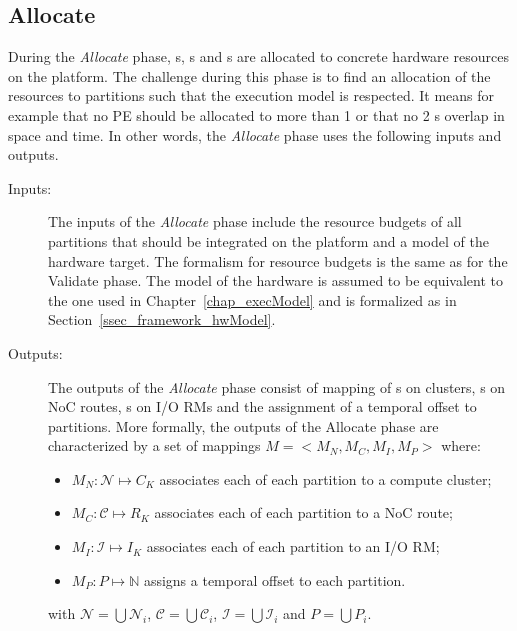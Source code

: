 \documentclass[main.tex]{subfiles}
\begin{document}
\subsection{Allocate} During the \emph{Allocate} phase, \PN{}s, \PC{}s and
\ION{}s are allocated to concrete hardware resources on the platform. The
challenge during this phase is to find an allocation of the resources to
partitions such that the execution model is respected. It means for example
that no PE should be allocated to more than 1 \PN{} or that no 2 \PC{}s overlap
in space and time. In other words, the \emph{Allocate} phase uses the following
inputs and outputs.
\begin{description}
    \item[Inputs: ]
        The inputs of the \emph{Allocate} phase include the resource budgets of
        all partitions that should be integrated on the platform and a model of
        the hardware target. The formalism for resource budgets is the same as
        for the Validate phase. The model of the hardware is assumed to be
        equivalent to the one used in Chapter~\ref{chap_execModel} and is
        formalized as in Section~\ref{ssec_framework_hwModel}. 
    \item[Outputs: ]
        The outputs of the \emph{Allocate} phase consist of mapping of \PN{}s
        on clusters, \PC{}s on NoC routes, \ION{}s on I/O RMs and the
        assignment of a temporal offset to partitions. More formally, the
        outputs of the Allocate phase are characterized by a set of mappings $M
        = < M_N , M_C , M_I , M_P >$ where:  
        \begin{itemize}
            \item $M_N : \mathcal{N} \mapsto C_K$ associates each \PN{} of each
                partition to a compute cluster;
            \item $M_C : \mathcal{C} \mapsto R_K$ associates each \PC{} of each
                partition to a NoC route;
            \item $M_I : \mathcal{I} \mapsto I_K$ associates each \ION{} of
                each partition to an I/O RM;
            \item $M_P : P \mapsto \mathbb{N}$ assigns a temporal offset to
                each partition.
        \end{itemize}
        with $\mathcal{N} = \bigcup \mathcal{N}_i$, $\mathcal{C} = \bigcup \mathcal{C}_i$, $\mathcal{I} = \bigcup \mathcal{I}_i$ and $P = \bigcup P_i$.


\end{description}
\end{document}
